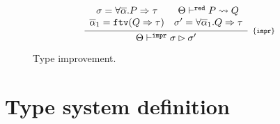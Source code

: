 \documentclass[a4paper, 11pt]{article}
\theoremstyle{definition}
\begin{document}
\begin{figure}[H]
  \[
    \infer[_{\{\mathtt{impr}\}}]
          {\Theta \impr \sigma \rhd \sigma'}
          {\begin{array}{cc}
            \sigma = \forall\overline{\alpha} . P \Rightarrow \tau & \Theta \reduce P \leadsto Q \\
            \overline{\alpha}_1 = \ftv(Q \Rightarrow \tau) & \sigma' = \forall \overline{\alpha}_1 . Q\Rightarrow\tau\\
           \end{array}}
  \]
  \centering
  \caption{Type improvement.}
  \label{fig:impr}
\end{figure}
%



\section{Type system definition}
\end{document}
